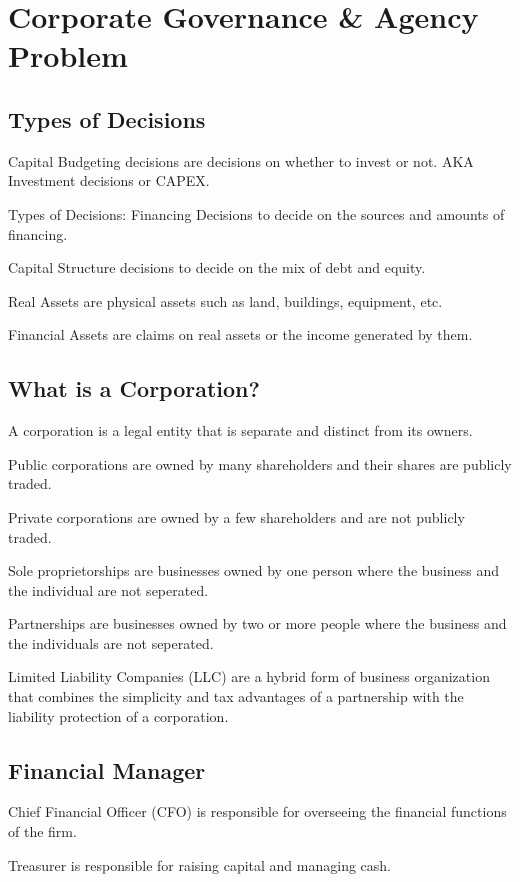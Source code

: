 \section{Corporate Governance \& Agency Problem}
\subsection{Types of Decisions}
Capital Budgeting decisions are decisions on whether to invest or not.
AKA Investment decisions or CAPEX.

Types of Decisions:
Financing Decisions to decide on the sources and amounts of financing.

Capital Structure decisions to decide on the mix of debt and equity.

Real Assets are physical assets such as land, buildings, equipment, etc.

Financial Assets are claims on real assets or the income generated by them.

\subsection{What is a Corporation?}

A corporation is a legal entity that is separate and distinct from its owners.

Public corporations are owned by many shareholders and their shares are publicly traded.

Private corporations are owned by a few shareholders and are not publicly traded.

Sole proprietorships are businesses owned by one person where the business and the individual are not seperated.

Partnerships are businesses owned by two or more people where the business and the individuals are not seperated.

Limited Liability Companies (LLC) are a hybrid form of business organization that combines the simplicity and tax advantages of a partnership with the liability protection of a corporation.

\subsection{Financial Manager}

Chief Financial Officer (CFO) is responsible for overseeing the financial functions of the firm.

Treasurer is responsible for raising capital and managing cash.

